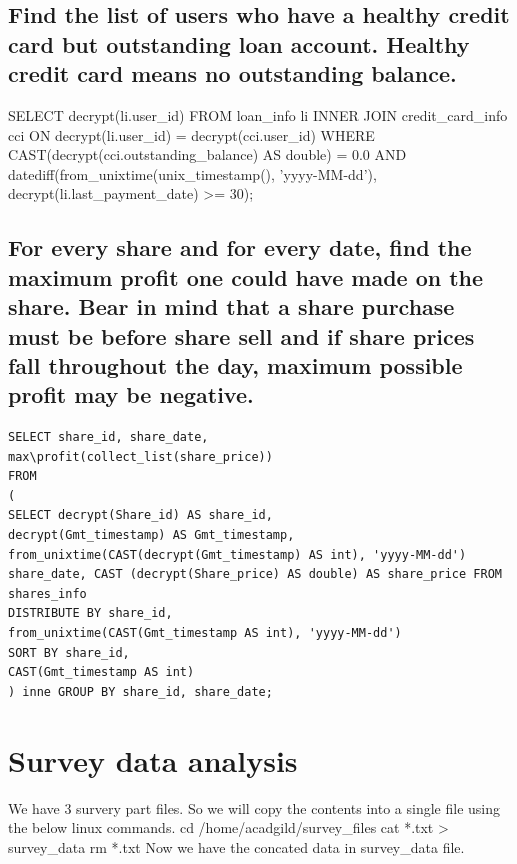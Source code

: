 \subsection{Find the list of users who have a healthy credit card but outstanding loan account.
Healthy credit card means no outstanding balance.}
SELECT decrypt(li.user\_id) \newline
FROM loan\_info li INNER JOIN credit\_card\_info \newline
cci ON decrypt(li.user\_id) = decrypt(cci.user\_id) \newline
WHERE CAST(decrypt(cci.outstanding\_balance) AS double) = 0.0 \newline
AND datediff(from\_unixtime(unix\_timestamp(), 'yyyy-MM-dd'), \newline
decrypt(li.last\_payment\_date) >= 30); \newpage

\subsection{For every share and for every date, find the maximum profit one could have made
on the share. Bear in mind that a share purchase must be before share sell and if share
prices fall throughout the day, maximum possible profit may be negative.}
\begin{verbatim}
SELECT share_id, share_date,
max\profit(collect_list(share_price))
FROM
( 
SELECT decrypt(Share_id) AS share_id,
decrypt(Gmt_timestamp) AS Gmt_timestamp,
from_unixtime(CAST(decrypt(Gmt_timestamp) AS int), 'yyyy-MM-dd')
share_date, CAST (decrypt(Share_price) AS double) AS share_price FROM
shares_info
DISTRIBUTE BY share_id,
from_unixtime(CAST(Gmt_timestamp AS int), 'yyyy-MM-dd')
SORT BY share_id,
CAST(Gmt_timestamp AS int)
) inne GROUP BY share_id, share_date;
\end{verbatim}
\section{Survey data analysis}

We have 3 survery part files. So we will copy the contents into a \newline single file using the below \newline
linux commands. \newline
cd /home/acadgild/survey\_files \newline
cat *.txt > survey\_data \newline
rm *.txt \newline
Now we have the concated data in survey\_data file.\newline
\newpage

